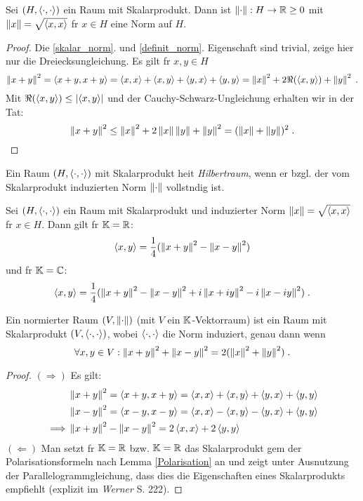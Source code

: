 \begin{theorem}
	Sei \((H, \ip{\cdot,\cdot})\) ein Raum mit Skalarprodukt. Dann ist \(\norm\cdot : H \to \R \geq 0 \) mit \( \norm x = \sqrt{\ip{x,x}}\) f\us r \(x \in H\) eine Norm auf $H$.
	\label{NormSP}
\end{theorem}
\begin{proof}
	Die \ref{skalar_norm}. und \ref{definit_norm}. Eigenschaft sind trivial, zeige hier nur die Dreiecksungleichung. Es gilt f\us r \(x,y \in H\)
	\[\norm{x+y}^2 = \ip{x+y, x+y} = \ip{x,x} + \ip{x,y} + \ip{y,x} + \ip{y,y} = \norm{x}^2 + 2 \Re(\ip{x,y}) + \norm{y}^2 \;.
	\]
	Mit \(\Re(\ip{x,y}) \leq \ab{\ip{x,y}}\) und der Cauchy-Schwarz-Ungleichung erhalten wir in der Tat:
	\[\norm{x+y}^2 \leq \norm{x}^2 + 2 \norm x \norm y + \norm{y}^2 = (\norm x + \norm y)^2 \;.\]
\end{proof}

\begin{definition}
  Ein Raum \((H, \ip{\cdot, \cdot})\) mit Skalarprodukt hei\s t \textit{Hilbertraum}, wenn er bzgl. der vom Skalarprodukt induzierten Norm \(\norm \cdot\) vollst\as ndig ist.
\end{definition}

\begin{lemma}[Polarisationsformel]
	Sei \((H, \ip{\cdot, \cdot})\) ein Raum mit Skalarprodukt und induzierter Norm \(\norm x = \sqrt{\ip{x,x}}\) f\us r \(x \in H\). Dann gilt f\us r \(\K = \R\): 
	\[\ip{x,y} = \frac{1}{4} (\norm{x+y}^2 - \norm{x-y}^2)\]
	und f\us r \(\K = \C\):
	\[\ip{x,y} = \frac{1}{4}(\norm{x+y}^2 - \norm{x-y}^2 + i\norm{x+iy}^2 - i\norm{x-iy}^2)\;.\]
	\label{Polarisation}
\end{lemma}

\begin{theorem}[Parallelogrammgleichung]
	Ein normierter Raum \((V, \norm \cdot)\) (mit $V$ ein $\K$-Vektorraum) ist ein Raum mit Skalarprodukt \((V, \ip{\cdot, \cdot})\), wobei \(\ip{\cdot, \cdot}\) die Norm induziert, genau dann wenn 
	\[\forall x, y \in V: \norm{x+y}^2 + \norm{x-y}^2 = 2(\norm{x}^2 + \norm{y}^2)\;.\]
\end{theorem}
\begin{proof}
	\((\Longrightarrow)\) Es gilt: 
	\begin{align*}
		& \norm{x+y}^2 = \ip{x+y, x+y} = \ip{x,x} + \ip{x,y} + \ip{y,x} + \ip{y,y}\\
		& \norm{x-y}^2 = \ip{x-y, x-y} = \ip{x,x} - \ip{x,y} - \ip{y,x} + \ip{y,y}\\
		\implies & \norm{x+y}^2 -  \norm{x-y}^2  = 2 \ip{x,x} +  2 \ip{y,y}
	\end{align*}
	\((\Longleftarrow)\) Man setzt f\us r \(\K = \R \) bzw. \(\K = \R\) das Skalarprodukt gem\as \s{} der Polarisationsformeln nach Lemma \ref{Polarisation} an und zeigt unter Ausnutzung der Parallelogrammgleichung, dass dies die Eigenschaften eines Skalarprodukts empfiehlt (explizit im \textit{Werner} S. 222).
\end{proof}

